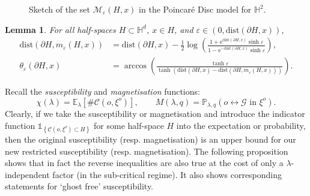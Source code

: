\documentclass[10pt,a4paper,dvipsnames]{article}
\newtheorem{lemma}[theorem]{Lemma}
\theoremstyle{definition}
\theoremstyle{remark}
\newcommand{\plaq}{\mathbb{P}_{\lambda,q}}
\newcommand{\ela}{\mathbb E_{\lambda}}
\newcommand{\Mcal}{\mathcal{M}}
\newcommand{\HypTwo}{{\mathbb{H}^2}}
\newcommand{\HypDim}{{\mathbb{H}^d}}
\newcommand{\C}{\mathscr {C}}
\newcommand{\Gcal}{\mathcal{G}}
\newcommand{\conn}[3]{#1 \longleftrightarrow #2\textrm { in } #3}
\newcommand{\Id}{\mathds 1}
\newcommand{\dist}[1]{\mathrm{dist}\left(#1\right)}
\newcommand{\orig}{o}
\newcommand{\e}{\mathrm{e}}
\numberwithin{equation}{section}
\begin{document}
    \begin{figure}
        \centering
        \caption{Sketch of the set $\Mcal_\varepsilon(H,x)$ in the Poincar{\'e} Disc model for $\HypTwo$.}
        \label{fig:PulledHalfSpace}
    \end{figure}


\begin{lemma}
\label{lem:distancecalculation}
    For all half-spaces $H\subset \HypDim$, $x\in H$, and $\varepsilon\in\left(0,\dist{\partial H,x}\right)$,
    \begin{align}
        \dist{\partial H,m_\varepsilon( H,x)} &= \dist{\partial H,x} - \frac{1}{2}\log\left(\frac{1+\e^{\dist{\partial H,x}}\sinh \varepsilon}{1-\e^{-\dist{\partial H,x}}\sinh\varepsilon}\right),\\
        \theta_\varepsilon\left(\partial H,x\right) &= \arccos\left(\frac{\tanh\varepsilon}{\tanh\left(\dist{\partial H,x}-\dist{\partial H,m_\varepsilon( H,x)}\right)}\right).
    \end{align}
\end{lemma}



Recall the \emph{susceptibility} and \emph{magnetisation} functions:
\begin{equation}
    \chi\left(\lambda\right) = \ela\left[\#\C\left(\orig,\xi^\orig\right)\right],\qquad M\left(\lambda,q\right) = \plaq\left(\conn{\orig}{\Gcal}{\xi^\orig}\right).
\end{equation}
Clearly, if we take the susceptibility or magnetisation and introduce the indicator function $\Id_{\left\{\C\left(\orig,\xi^{\orig}\right)\subset H\right\}}$ for some half-space $H$ into the expectation or probability, then the original susceptibility (resp. magnetisation) is an upper bound for our new restricted susceptibility (resp. magnetisation). The following proposition shows that in fact the reverse inequalities are also true at the cost of only a $\lambda$-independent factor (in the sub-critical regime). It also shows corresponding statements for `ghost free' susceptibility.
\end{document}
